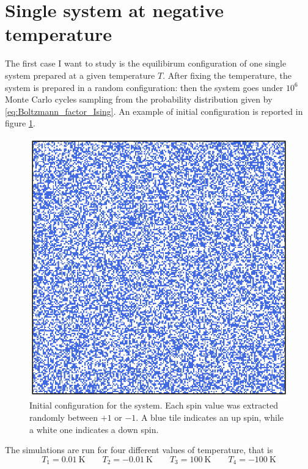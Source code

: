 \section{Single system at negative temperature}
The first case I want to study is the equilibirum configuration of one single system prepared at a given temperature $T$. After fixing the temperature, the system is prepared in a random configuration: then the system goes under $10^6$ Monte Carlo cycles 
sampling from the probability distribution given by \ref{eq:Boltzmann_factor_Ising}. An example of initial configuration is reported in figure \ref{fig:initial_configuration}. \par
\begin{figure}[htp]
    \centering 
    \centering
    \includegraphics[scale=0.6]{./images/ising/initconf.eps}
    \caption{Initial configuration for the system. Each spin value was extracted randomly between $+1$ or $-1$. A blue tile indicates an up spin, while a white one indicates a down spin.}
    \label{fig:initial_configuration}
\end{figure}
The simulations are run for four different values of temperature, that is 
\begin{equation*}
    T_1 = \SI{0.01}{\kelvin} \qquad T_2 = \SI{-0.01}{\kelvin} \qquad T_3 = \SI{100}{\kelvin} \qquad T_4 = \SI{-100}{\kelvin}
\end{equation*}
